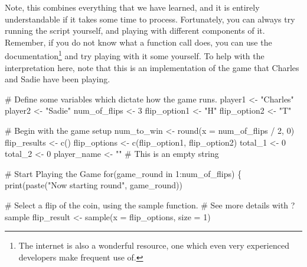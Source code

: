 \documentclass[
  letterpaper,
  DIV=11,
  numbers=noendperiod]{scrreprt}
\newenvironment{Shaded}{\begin{snugshade}}{\end{snugshade}}
\newcommand{\AttributeTok}[1]{\textcolor[rgb]{0.40,0.45,0.13}{#1}}
\newcommand{\CommentTok}[1]{\textcolor[rgb]{0.37,0.37,0.37}{#1}}
\newcommand{\ControlFlowTok}[1]{\textcolor[rgb]{0.00,0.23,0.31}{#1}}
\newcommand{\DecValTok}[1]{\textcolor[rgb]{0.68,0.00,0.00}{#1}}
\newcommand{\FunctionTok}[1]{\textcolor[rgb]{0.28,0.35,0.67}{#1}}
\newcommand{\NormalTok}[1]{\textcolor[rgb]{0.00,0.23,0.31}{#1}}
\newcommand{\OtherTok}[1]{\textcolor[rgb]{0.00,0.23,0.31}{#1}}
\newcommand{\SpecialCharTok}[1]{\textcolor[rgb]{0.37,0.37,0.37}{#1}}
\newcommand{\StringTok}[1]{\textcolor[rgb]{0.13,0.47,0.30}{#1}}
\theoremstyle{definition}
\theoremstyle{definition}
\theoremstyle{definition}
\theoremstyle{remark}
\begin{document}
Note, this combines everything that we have learned, and it is entirely
understandable if it takes some time to process. Fortunately, you can
always try running the script yourself, and playing with different
components of it. Remember, if you do not know what a function call
does, you can use the documentation\footnote{The internet is also a
  wonderful resource, one which even very experienced developers make
  frequent use of.} and try playing with it some yourself. To help with
the interpretation here, note that this is an implementation of the game
that Charles and Sadie have been playing.

\begin{Shaded}
\begin{Highlighting}[]
\CommentTok{\# Define some variables which dictate how the game runs.}
\NormalTok{player1 }\OtherTok{\textless{}{-}} \StringTok{"Charles"}
\NormalTok{player2 }\OtherTok{\textless{}{-}} \StringTok{"Sadie"}
\NormalTok{num\_of\_flips }\OtherTok{\textless{}{-}} \DecValTok{3}
\NormalTok{flip\_option1 }\OtherTok{\textless{}{-}} \StringTok{"H"}
\NormalTok{flip\_option2 }\OtherTok{\textless{}{-}} \StringTok{"T"}

\CommentTok{\# Begin with the game setup}
\NormalTok{num\_to\_win }\OtherTok{\textless{}{-}} \FunctionTok{round}\NormalTok{(}\AttributeTok{x =}\NormalTok{ num\_of\_flips }\SpecialCharTok{/} \DecValTok{2}\NormalTok{, }\DecValTok{0}\NormalTok{)}
\NormalTok{flip\_results }\OtherTok{\textless{}{-}} \FunctionTok{c}\NormalTok{()}
\NormalTok{flip\_options }\OtherTok{\textless{}{-}} \FunctionTok{c}\NormalTok{(flip\_option1, flip\_option2)}
\NormalTok{total\_1 }\OtherTok{\textless{}{-}} \DecValTok{0}
\NormalTok{total\_2 }\OtherTok{\textless{}{-}} \DecValTok{0}
\NormalTok{player\_name }\OtherTok{\textless{}{-}} \StringTok{""} \CommentTok{\# This is an \textquotesingle{}empty string\textquotesingle{}}

\CommentTok{\# Start Playing the Game}
\ControlFlowTok{for}\NormalTok{(game\_round }\ControlFlowTok{in} \DecValTok{1}\SpecialCharTok{:}\NormalTok{num\_of\_flips) \{}
    \FunctionTok{print}\NormalTok{(}\FunctionTok{paste}\NormalTok{(}\StringTok{"Now starting round"}\NormalTok{, game\_round))}

    \CommentTok{\# Select a flip of the coin, using the sample function.}
    \CommentTok{\# See more details with ?sample}
\NormalTok{    flip\_result }\OtherTok{\textless{}{-}} \FunctionTok{sample}\NormalTok{(}\AttributeTok{x =}\NormalTok{ flip\_options, }\AttributeTok{size =} \DecValTok{1}\NormalTok{)}


\end{Highlighting}
\end{Shaded}
\end{document}
